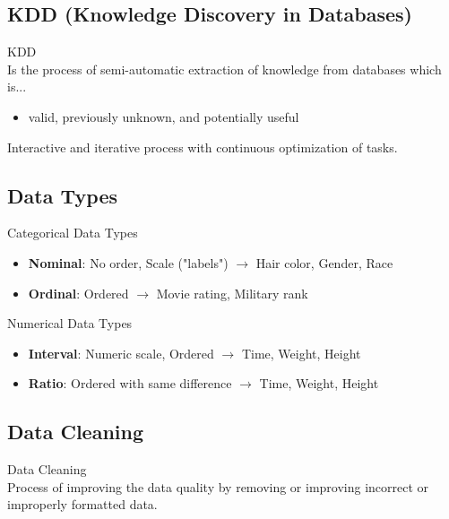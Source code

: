 \subsection{KDD (Knowledge Discovery in Databases)}

\begin{definition}{KDD}\\
Is the process of semi-automatic extraction of knowledge from databases which is...
\begin{itemize}
    \item valid, previously unknown, and potentially useful
\end{itemize}
Interactive and iterative process with continuous optimization of tasks.
\end{definition}


\subsection{Data Types}

\begin{definition}{Categorical Data Types}
\begin{itemize}
    \item \textbf{Nominal}: No order, Scale ("labels") $\rightarrow$ Hair color, Gender, Race
    \item \textbf{Ordinal}: Ordered $\rightarrow$ Movie rating, Military rank
\end{itemize}
\end{definition}

\begin{definition}{Numerical Data Types}
\begin{itemize}
    \item \textbf{Interval}: Numeric scale, Ordered $\rightarrow$ Time, Weight, Height
    \item \textbf{Ratio}: Ordered with same difference $\rightarrow$ Time, Weight, Height
\end{itemize}
\end{definition}

\subsection{Data Cleaning}

\begin{concept}{Data Cleaning}\\
Process of improving the data quality by removing or improving incorrect or improperly formatted data.
\end{concept}

